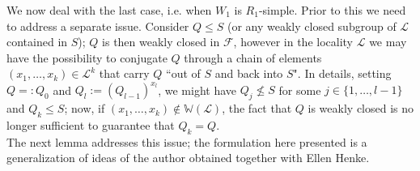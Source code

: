 \documentclass{amsart}
\numberwithin{equation}{section}
\theoremstyle{definition}
\theoremstyle{subresult}
\theoremstyle{caseresult}
\newcommand{\W}{\mathbb{W}}
\newcommand{\F}{\mathcal{F}}
\renewcommand{\L}{\mathcal{L}}
\newcommand{\<}{\langle}
\renewcommand{\>}{\rangle}
\begin{document}
\vspace{0.4cm}
We now deal with the last case, i.e. when $W_1$ is $R_1$-simple. Prior to this we need to address a separate issue.
Consider $Q \le S$ (or any weakly closed subgroup of $\L$ contained in $S$); $Q$ is then weakly closed in $\F$, however in the locality $\L$ we may have the possibility to conjugate $Q$ through a chain of elements $(x_1, \dots, x_k) \in \L^k$ that carry $Q$ ``out of $S$ and back into $S$". In details, setting $Q=:Q_0$ and $Q_l := (Q_{l-1})^{x_l}$, we might have $Q_j \not \le S$ for some $j \in \{1,\dots,l-1\}$ and $Q_k \le S$; now, if $(x_1, \dots, x_k) \not \in \W(\L)$, the fact that $Q$ is weakly closed is no longer sufficient to guarantee that $Q_k = Q$.\\
The next lemma addresses this issue; the formulation here presented is a generalization of ideas of the author obtained together with Ellen Henke.
\end{document}
